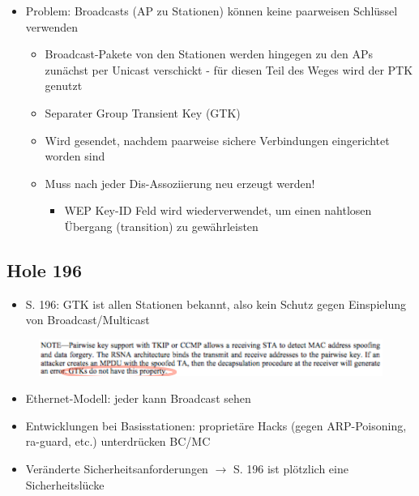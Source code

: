 \documentclass[openany]{book}
\begin{document}
\begin{itemize}
    \item Problem: Broadcasts (AP zu Stationen) können keine paarweisen Schlüssel verwenden
    \begin{itemize}
        \item Broadcast-Pakete von den Stationen werden hingegen zu den APs zunächst per Unicast verschickt - für diesen Teil des Weges wird der PTK genutzt
        \item Separater Group Transient Key (GTK)
        \item Wird gesendet, nachdem paarweise sichere Verbindungen eingerichtet worden sind
        \item Muss nach jeder Dis-Assoziierung neu erzeugt werden!
        \begin{itemize}
            \item WEP Key-ID Feld wird wiederverwendet, um einen nahtlosen Übergang (transition) zu gewährleisten
        \end{itemize}
    \end{itemize}
\end{itemize}

\subsection{Hole 196}

\begin{itemize}
    \item S. 196: GTK ist allen Stationen bekannt, also kein Schutz gegen Einspielung von Broadcast/Multicast
\end{itemize}

\begin{figure}[h!]
    \centering
    \includegraphics[width=\linewidth]{Pics/Hole196.PNG}
\end{figure}

\begin{itemize}
    \item Ethernet-Modell: jeder kann Broadcast sehen
    \item Entwicklungen bei Basisstationen: proprietäre Hacks (gegen ARP-Poisoning, ra-guard, etc.) unterdrücken BC/MC
    \item Veränderte Sicherheitsanforderungen $\rightarrow$ S. 196 ist plötzlich eine Sicherheitslücke 
\end{itemize}
\end{document}
